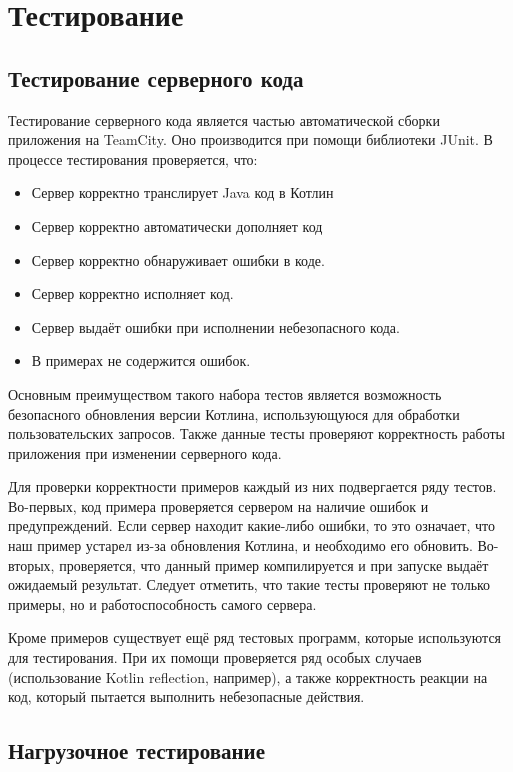\chapter{Тестирование}
\section{Тестирование серверного кода}
	Тестирование серверного кода является частью автоматической сборки приложения на TeamCity. Оно производится при помощи библиотеки JUnit. В процессе тестирования проверяется, что:
\begin{itemize}
\item Сервер корректно транслирует Java код в Котлин
\item Сервер корректно автоматически дополняет код
\item Сервер корректно обнаруживает ошибки в коде.
\item Сервер корректно исполняет код.
\item Сервер выдаёт ошибки при исполнении небезопасного кода.
\item В примерах не содержится ошибок. 
\end{itemize}
	
	Основным преимуществом такого набора тестов является возможность безопасного обновления версии Котлина, использующуюся для обработки пользовательских запросов. Также данные тесты проверяют корректность работы приложения при изменении серверного кода.
	
	Для проверки корректности примеров каждый из них подвергается ряду тестов. Во-первых, код примера проверяется сервером на наличие ошибок и предупреждений. Если сервер находит какие-либо ошибки, то это означает, что наш пример устарел из-за обновления Котлина, и необходимо его обновить. Во-вторых, проверяется, что данный пример компилируется и при запуске выдаёт ожидаемый результат. Следует отметить, что такие тесты проверяют не только примеры, но и работоспособность самого сервера. 
	
	Кроме примеров существует ещё ряд тестовых программ, которые  используются для тестирования. При их помощи проверяется ряд особых случаев (использование Kotlin reflection, например), а также корректность реакции на код, который пытается выполнить небезопасные действия.
	
\section{Нагрузочное тестирование}

